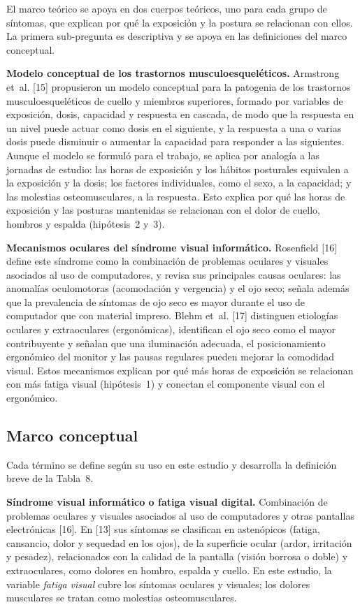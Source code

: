 El marco teórico se apoya en dos cuerpos teóricos, uno para cada grupo de síntomas, que
explican por qué la exposición y la postura se relacionan con ellos. La primera
sub-pregunta es descriptiva y se apoya en las definiciones del marco conceptual.

\medskip
\noindent\textbf{Modelo conceptual de los trastornos musculoesqueléticos.} Armstrong et~al.
[15] propusieron un modelo conceptual para la patogenia de los trastornos
musculoesqueléticos de cuello y miembros superiores, formado por variables de
exposición, dosis, capacidad y respuesta en cascada, de modo que la respuesta en un nivel
puede actuar como dosis en el siguiente, y la respuesta a una o varias dosis puede
disminuir o aumentar la capacidad para responder a las siguientes. Aunque el modelo se
formuló para el trabajo, se aplica por analogía a las jornadas de estudio: las horas de
exposición y los hábitos posturales equivalen a la exposición y la dosis; los factores
individuales, como el sexo, a la capacidad; y las molestias osteomusculares, a la respuesta.
Esto explica por qué las horas de exposición y las posturas mantenidas se relacionan con el
dolor de cuello, hombros y espalda (hipótesis~2 y~3).

\medskip
\noindent\textbf{Mecanismos oculares del síndrome visual informático.} Rosenfield [16]
define este síndrome como la combinación de problemas oculares y visuales asociados al uso
de computadores, y revisa sus principales causas oculares: las anomalías oculomotoras
(acomodación y vergencia) y el ojo seco; señala además que la prevalencia de síntomas de
ojo seco es mayor durante el uso de computador que con material impreso. Blehm et~al. [17]
distinguen etiologías oculares y extraoculares (ergonómicas), identifican el ojo seco como
el mayor contribuyente y señalan que una iluminación adecuada, el posicionamiento
ergonómico del monitor y las pausas regulares pueden mejorar la comodidad visual. Estos
mecanismos explican por qué más horas de exposición se relacionan con más fatiga visual
(hipótesis~1) y conectan el componente visual con el ergonómico.

\subsection{Marco conceptual}

Cada término se define según su uso en este estudio y desarrolla la definición breve de
la Tabla~8.

\medskip
\noindent\textbf{Síndrome visual informático o fatiga visual digital.} Combinación de
problemas oculares y visuales asociados al uso de computadores y otras pantallas
electrónicas [16]. En [13] sus síntomas se clasifican en astenópicos (fatiga, cansancio, dolor y sequedad en los ojos), de la superficie
ocular (ardor, irritación y pesadez), relacionados con la calidad de la pantalla
(visión borrosa o doble) y extraoculares, como dolores en hombro, espalda y cuello. En este estudio, la variable \emph{fatiga visual} cubre los síntomas oculares y
visuales; los dolores musculares se tratan como molestias osteomusculares.

